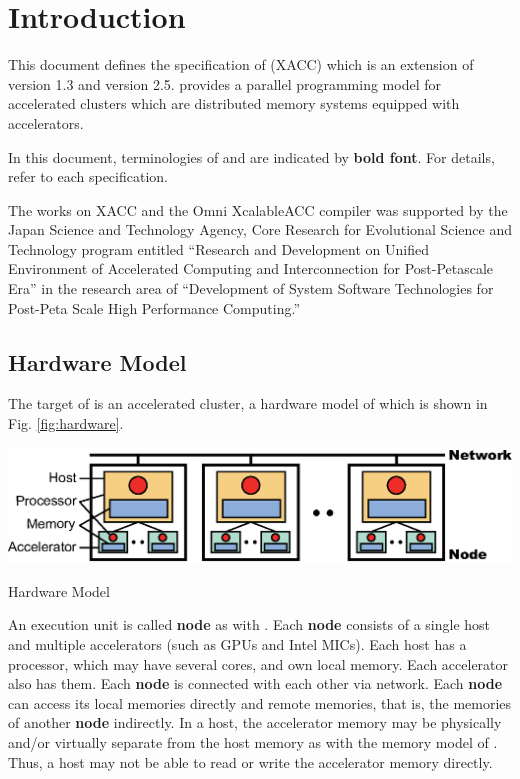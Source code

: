 \section{Introduction}\label{chap:intro}

\setcounter{page}{1}

This document defines the specification of {\XACC} (XACC) which is an extension
of {\XMP} version 1.3\cite{xmp} and {\OACC} version 2.5\cite{openacc}.
{\XACC} provides a parallel programming model for accelerated clusters
which are distributed memory systems equipped with accelerators.

In this document,
terminologies of {\XMP} and {\OACC} are indicated by {\bf bold font}.
For details, refer to each specification\cite{xmp,openacc}.

The works on XACC and the Omni XcalableACC compiler was
supported by the Japan Science and Technology Agency, 
Core Research for Evolutional Science and Technology program entitled 
``Research and Development on Unified Environment of Accelerated
Computing and Interconnection for Post-Petascale Era'' in the research
area of ``Development of System Software Technologies for Post-Peta
Scale High Performance Computing.''

\subsection{Hardware Model}
The target of {\XACC} is an accelerated cluster,
a hardware model of which is shown in Fig. \ref{fig:hardware}.

\begin{myfigure}
  \includegraphics[width=\textwidth]{figs/hardware.eps}
  \caption{Hardware Model}\label{fig:hardware}
\end{myfigure}

An execution unit is called {\bf node} as with {\XMP}.
Each {\bf node} consists of a single host and multiple accelerators (such as GPUs and Intel MICs).
Each host has a processor, which may have several cores, and own local memory.
Each accelerator also has them.
Each {\bf node} is connected with each other via network.
Each {\bf node} can access its local memories directly and remote memories,
that is, the memories of another {\bf node} indirectly.
In a host,
the accelerator memory may be physically and/or virtually separate from the host memory as with the memory model of {\OACC}.
Thus,
a host may not be able to read or write the accelerator memory directly.


